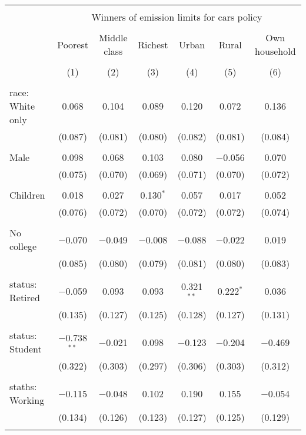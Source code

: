 
\begin{tabular}{@{\extracolsep{5pt}}lcccccc} 
\\[-1.8ex]\hline 
\hline \\[-1.8ex] 
 & \multicolumn{6}{c}{Winners of emission limits for cars policy} \\ 
\cline{2-7} 
\\[-1.8ex] & Poorest & Middle class & Richest & Urban & Rural & Own household \\ 
\\[-1.8ex] & (1) & (2) & (3) & (4) & (5) & (6)\\ 
\hline \\[-1.8ex] 
 race: White only & 0.068 & 0.104 & 0.089 & 0.120 & 0.072 & 0.136 \\ 
  & (0.087) & (0.081) & (0.080) & (0.082) & (0.081) & (0.084) \\ 
  & & & & & & \\ 
 Male & 0.098 & 0.068 & 0.103 & 0.080 & $-$0.056 & 0.070 \\ 
  & (0.075) & (0.070) & (0.069) & (0.071) & (0.070) & (0.072) \\ 
  & & & & & & \\ 
 Children & 0.018 & 0.027 & 0.130$^{*}$ & 0.057 & 0.017 & 0.052 \\ 
  & (0.076) & (0.072) & (0.070) & (0.072) & (0.072) & (0.074) \\ 
  & & & & & & \\ 
 No college & $-$0.070 & $-$0.049 & $-$0.008 & $-$0.088 & $-$0.022 & 0.019 \\ 
  & (0.085) & (0.080) & (0.079) & (0.081) & (0.080) & (0.083) \\ 
  & & & & & & \\ 
 status: Retired & $-$0.059 & 0.093 & 0.093 & 0.321$^{**}$ & 0.222$^{*}$ & 0.036 \\ 
  & (0.135) & (0.127) & (0.125) & (0.128) & (0.127) & (0.131) \\ 
  & & & & & & \\ 
 status: Student & $-$0.738$^{**}$ & $-$0.021 & 0.098 & $-$0.123 & $-$0.204 & $-$0.469 \\ 
  & (0.322) & (0.303) & (0.297) & (0.306) & (0.303) & (0.312) \\ 
  & & & & & & \\ 
 staths: Working & $-$0.115 & $-$0.048 & 0.102 & 0.190 & 0.155 & $-$0.054 \\ 
  & (0.134) & (0.126) & (0.123) & (0.127) & (0.125) & (0.129) \\ 
  & & & & & & \\ 

\end{tabular}
